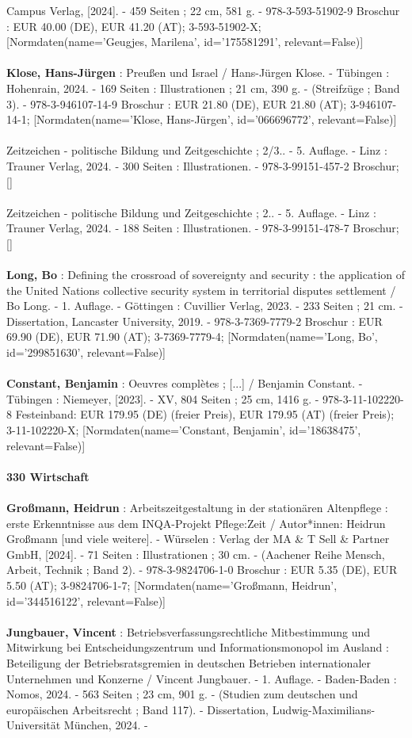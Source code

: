 \documentclass{article}
\begin{document}
\begin{multicols}{3}
Campus Verlag, [2024]. - 459 Seiten ; 22 cm, 581 g. - 978-3-593-51902-9 Broschur : EUR 40.00 (DE), EUR 41.20 (AT); 3-593-51902-X; [Normdaten(name='Geugjes, Marilena', id='175581291', relevant=False)]\\\\\textbf{Klose, Hans-Jürgen} : Preußen und Israel / Hans-Jürgen Klose. - Tübingen : Hohenrain, 2024. - 169 Seiten : Illustrationen ; 21 cm, 390 g. - (Streifzüge ; Band 3). - 978-3-946107-14-9 Broschur : EUR 21.80 (DE), EUR 21.80 (AT); 3-946107-14-1; [Normdaten(name='Klose, Hans-Jürgen', id='066696772', relevant=False)]\\\\Zeitzeichen - politische Bildung und Zeitgeschichte ; 2/3.. - 5. Auflage. - Linz : Trauner Verlag, 2024. - 300 Seiten : Illustrationen. - 978-3-99151-457-2 Broschur; []\\\\Zeitzeichen - politische Bildung und Zeitgeschichte ; 2.. - 5. Auflage. - Linz : Trauner Verlag, 2024. - 188  Seiten : Illustrationen. - 978-3-99151-478-7 Broschur; []\\\\\textbf{Long, Bo} : Defining the crossroad of sovereignty and security : the application of the United Nations collective security system in territorial disputes settlement / Bo Long. - 1. Auflage. - Göttingen : Cuvillier Verlag, 2023. - 233 Seiten ; 21 cm. - Dissertation, Lancaster University, 2019. - 978-3-7369-7779-2 Broschur : EUR 69.90 (DE), EUR 71.90 (AT); 3-7369-7779-4; [Normdaten(name='Long, Bo', id='299851630', relevant=False)]\\\\\textbf{Constant, Benjamin} : Oeuvres complètes ; [...] / Benjamin Constant. - Tübingen : Niemeyer, [2023]. - XV, 804 Seiten ; 25 cm, 1416 g. - 978-3-11-102220-8 Festeinband: EUR 179.95 (DE) (freier Preis), EUR 179.95 (AT) (freier Preis); 3-11-102220-X; [Normdaten(name='Constant, Benjamin', id='18638475', relevant=False)]\\\\\textbf{330 Wirtschaft}\\\\\textbf{Großmann, Heidrun} : Arbeitszeitgestaltung in der stationären Altenpflege : erste Erkenntnisse aus dem INQA-Projekt Pflege:Zeit / Autor*innen: Heidrun Großmann [und viele weitere]. - Würselen : Verlag der MA \& T Sell \& Partner GmbH, [2024]. - 71 Seiten : Illustrationen ; 30 cm. - (Aachener Reihe Mensch, Arbeit, Technik ; Band 2). - 978-3-9824706-1-0 Broschur : EUR 5.35 (DE), EUR 5.50 (AT); 3-9824706-1-7; [Normdaten(name='Großmann, Heidrun', id='344516122', relevant=False)]\\\\\textbf{Jungbauer, Vincent} : Betriebsverfassungsrechtliche Mitbestimmung und Mitwirkung bei Entscheidungszentrum und Informationsmonopol im Ausland : Beteiligung der Betriebsratsgremien in deutschen Betrieben internationaler Unternehmen und Konzerne / Vincent Jungbauer. - 1. Auflage. - Baden-Baden : Nomos, 2024. - 563 Seiten ; 23 cm, 901 g. - (Studien zum deutschen und europäischen Arbeitsrecht ; Band 117). - Dissertation, Ludwig-Maximilians-Universität München, 2024. - 
\end{multicols}
\end{document}
